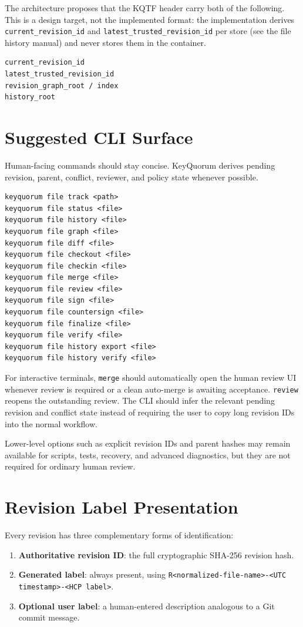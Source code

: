 \documentclass[11pt]{article}
\begin{document}
The architecture proposes that the KQTF header carry both of the following.
This is a design target, not the implemented format: the implementation
derives \texttt{current\_revision\_id} and \texttt{latest\_trusted\_revision\_id}
per store (see the file history manual) and never stores them in the container.
\begin{lstlisting}
current_revision_id
latest_trusted_revision_id
revision_graph_root / index
history_root
\end{lstlisting}

\section{Suggested CLI Surface}

Human-facing commands should stay concise. KeyQuorum derives pending revision, parent, conflict, reviewer, and policy state whenever possible.

\begin{lstlisting}
keyquorum file track <path>
keyquorum file status <file>
keyquorum file history <file>
keyquorum file graph <file>
keyquorum file diff <file>
keyquorum file checkout <file>
keyquorum file checkin <file>
keyquorum file merge <file>
keyquorum file review <file>
keyquorum file sign <file>
keyquorum file countersign <file>
keyquorum file finalize <file>
keyquorum file verify <file>
keyquorum file history export <file>
keyquorum file history verify <file>
\end{lstlisting}

For interactive terminals, \texttt{merge} should automatically open the human review UI whenever review is required or a clean auto-merge is awaiting acceptance. \texttt{review} reopens the outstanding review. The CLI should infer the relevant pending revision and conflict state instead of requiring the user to copy long revision IDs into the normal workflow.

Lower-level options such as explicit revision IDs and parent hashes may remain available for scripts, tests, recovery, and advanced diagnostics, but they are not required for ordinary human review.


\section{Revision Label Presentation}

Every revision has three complementary forms of identification:

\begin{enumerate}[leftmargin=1.8em]
  \item \textbf{Authoritative revision ID}: the full cryptographic SHA-256 revision hash.
  \item \textbf{Generated label}: always present, using \texttt{R<normalized-file-name>-<UTC timestamp>-<HCP label>}.
  \item \textbf{Optional user label}: a human-entered description analogous to a Git commit message.
\end{enumerate}
\end{document}
